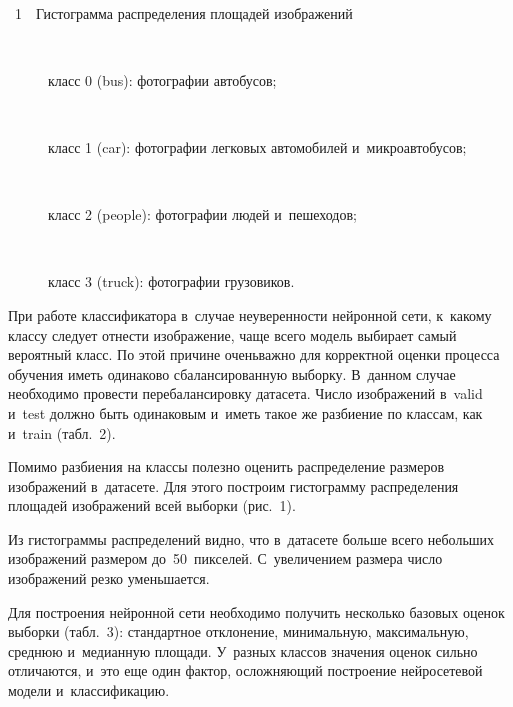 \begin{multicols}{2}
 \vspace*{9pt}

 { \begin{center}  %
    \mbox{%
\epsfxsize=78.317mm
}

\end{center}

\vspace*{3pt}

\noindent
{{\figurename~1}\ \ \small{Гистограмма распределения площадей изображений
}}}


\addtocounter{figure}{1}




  
  \noindent
  \begin{description}
  \item[\,]  класс 0 (bus): фотографии автобусов;
  \item[\,] класс 1 (car): фотографии легковых автомобилей и~микроавтобусов;
  \item[\,] класс 2 (people): фотографии людей и~пешеходов;
  \item[\,] класс 3 (truck): фотографии грузовиков.
  \end{description}
  
  При работе классификатора в~случае не\-уве\-рен\-ности нейронной сети, 
к~какому классу следует отнести изображение, чаще всего модель выбирает 
самый вероятный класс. По этой причине очень\linebreak \mbox{важ\-но} для корректной оценки 
процесса обуче\-ния иметь одинаково сбалансированную выборку. В~данном 
случае необходимо про\-вес\-ти перебалансировку датасета. Чис\-ло изображений 
в~valid и~test долж\-но быть одинаковым и~иметь такое же раз\-би\-ение по классам, 
как и~train (табл.~2).

Помимо разбиения на классы полезно оценить распределение размеров 
изображений в~датасете.
 Для этого по\-стро\-им гистограмму распределения 
площадей изображений всей выборки (рис.~1).
  
  Из гистограммы распределений видно, что в~датасете больше всего 
небольших изображений размером до~50~пикселей. С~увеличением размера 
чис\-ло изображений рез\-ко уменьшается. 

Для по\-стро\-ения нейронной сети 
необходимо получить несколько базовых оценок выборки (табл.~3): 
стандартное отклонение, 
минимальную, 
 максимальную, сред\-нюю и~медианную 
площади. У~разных классов значения оценок сильно отличаются, и~это еще 
один фактор, ослож\-ня\-ющий по\-стро\-ение нейросетевой модели 
и~клас\-си\-фи\-ка\-цию.
{ %

}
\end{multicols}
